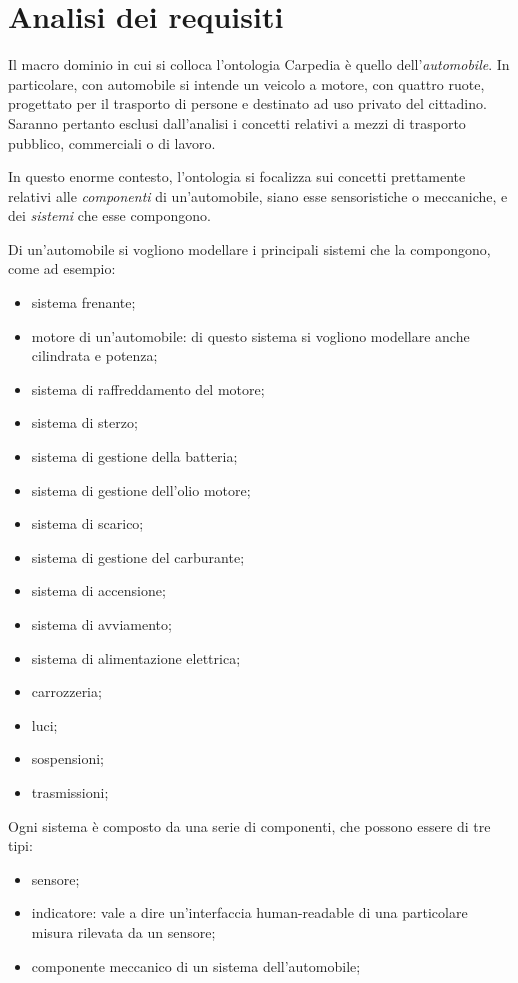 \chapter{Analisi dei requisiti}
Il macro dominio in cui si colloca l'ontologia Carpedia è quello dell'\textit{automobile}. In particolare, con automobile si intende un veicolo a motore, con quattro ruote,
progettato per il trasporto di persone e destinato ad uso privato del cittadino.
Saranno pertanto esclusi dall'analisi i concetti relativi a mezzi di trasporto pubblico, commerciali o di lavoro.

In questo enorme contesto, l'ontologia si focalizza sui concetti prettamente relativi alle \textit{componenti} di un'automobile, siano esse sensoristiche o meccaniche, e dei \textit{sistemi} che
esse compongono.

Di un'automobile si vogliono modellare i principali sistemi che la compongono, come ad esempio:

\begin{itemize}
    \item sistema frenante;
    \item motore di un'automobile: di questo sistema si vogliono modellare anche cilindrata e potenza;
    \item sistema di raffreddamento del motore;
    \item sistema di sterzo;
    \item sistema di gestione della batteria;
    \item sistema di gestione dell'olio motore;
    \item sistema di scarico;
    \item sistema di gestione del carburante;
    \item sistema di accensione;
    \item sistema di avviamento;
    \item sistema di alimentazione elettrica;
    \item carrozzeria;
    \item luci;
    \item sospensioni;
    \item trasmissioni;
\end{itemize}

Ogni sistema è composto da una serie di componenti, che possono essere di tre tipi:
\begin{itemize}
    \item sensore;
    \item indicatore: vale a dire un'interfaccia human-readable di una particolare misura rilevata da un sensore;
    \item componente meccanico di un sistema dell'automobile;
\end{itemize}

